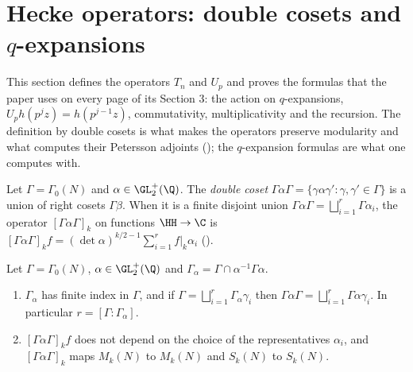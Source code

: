 \section{Hecke operators: double cosets and $q$-expansions}\label{sec:hecke:operators}

This section defines the operators $T_n$ and $U_p$ and proves the formulas that the paper uses on every page of its Section 3: the action on $q$-expansions,
$U_ph(p^jz)=h(p^{j-1}z)$, commutativity, multiplicativity and the recursion. The definition by double cosets is what makes the operators preserve modularity and
what computes their Petersson adjoints (); the $q$-expansion formulas are what one computes with.

\begin{definition}\label{def:hecke:double-coset}
Let $\Gamma=\Gamma_0(N)$ and $\alpha\in\GL_2^+(\Q)$. The \emph{double coset} $\Gamma\alpha\Gamma=\{\gamma\alpha\gamma':\gamma,\gamma'\in\Gamma\}$ is a union of right cosets $\Gamma\beta$. When it is a finite
disjoint union $\Gamma\alpha\Gamma=\bigsqcup_{i=1}^r\Gamma\alpha_i$, the operator $[\Gamma\alpha\Gamma]_k$ on functions $\HH\to\C$ is $[\Gamma\alpha\Gamma]_kf=(\det\alpha)^{k/2-1}\sum_{i=1}^rf|_k\alpha_i$
().
\end{definition}

\begin{proposition}\label{prop:hecke:double-coset}
Let $\Gamma=\Gamma_0(N)$, $\alpha\in\GL_2^+(\Q)$ and $\Gamma_\alpha=\Gamma\cap\alpha^{-1}\Gamma\alpha$.
\begin{enumerate}[label=(\roman*)]
\item $\Gamma_\alpha$ has finite index in $\Gamma$, and if $\Gamma=\bigsqcup_{i=1}^r\Gamma_\alpha\gamma_i$ then $\Gamma\alpha\Gamma=\bigsqcup_{i=1}^r\Gamma\alpha\gamma_i$. In particular $r=[\Gamma:\Gamma_\alpha]$.
\item $[\Gamma\alpha\Gamma]_kf$ does not depend on the choice of the representatives $\alpha_i$, and $[\Gamma\alpha\Gamma]_k$ maps $M_k(N)$ to $M_k(N)$ and $S_k(N)$ to $S_k(N)$.
\end{enumerate}
\end{proposition}

